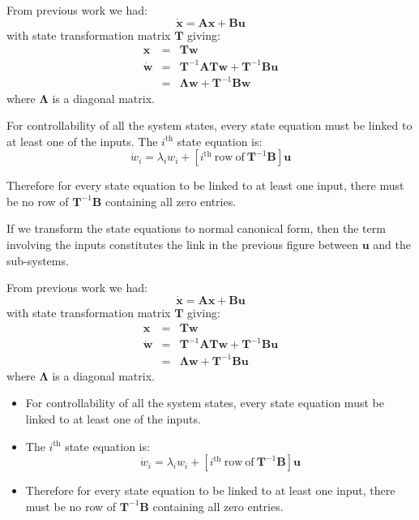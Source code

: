 From previous work we had:
\[
\dot{\mathbf{x}} = \mathbf{Ax} + \mathbf{Bu}
\]
with state transformation matrix $\mathbf{T}$ giving:
\begin{eqnarray*}
	\mathbf{x} & = & \mathbf{Tw} \\
	\dot{\mathbf{w}}& = &\mathbf{T}^{-1}\mathbf{ATw}+\mathbf{T}^{-1}\mathbf{Bu} \\
	& = & \mathbf{\Lambda w} + \mathbf{T}^{-1}\mathbf{Bw}
\end{eqnarray*}
where $\mathbf{\Lambda}$ is a diagonal matrix.
 
For controllability of all the system states, every state equation must be linked to at least one of the inputs. The $i^\mathrm{th}$ state equation is:
\[
\dot{w}_i = \lambda_iw_i + \left[i^{\mathrm{th}}\mathrm{\ row\ of\ }\mathbf{T}^{-1}\mathbf{B}\right]\mathbf{u}
\]
 
Therefore for every state equation to be linked to at least one input, there must be no row of $\mathbf{T}^{-1}\mathbf{B}$  containing all zero entries.
\ifslidesonly
\begin{slide}
   If we transform the state equations to normal canonical form, then the term involving the inputs constitutes the link in the previous figure between $\mathbf{u}$ and the sub-systems.

From previous work we had:
\[
\dot{\mathbf{x}} = \mathbf{Ax} + \mathbf{Bu}
\]
with state transformation matrix $\mathbf{T}$ giving:
\begin{eqnarray*}
	\mathbf{x} & = & \mathbf{Tw} \\
	\dot{\mathbf{w}}& = &\mathbf{T}^{-1}\mathbf{ATw}+\mathbf{T}^{-1}\mathbf{Bu} \\
	& = & \mathbf{\Lambda w} + \mathbf{T}^{-1}\mathbf{Bu}
\end{eqnarray*}
where $\mathbf{\Lambda}$ is a diagonal matrix.
\end{slide}

\begin{slide}
\begin{itemize}
	\item For controllability of all the system states, every state equation must be linked to at least one of the inputs.
	\item  The $i^\mathrm{th}$ state equation is:
	\[
	\dot{w}_i = \lambda_iw_i + \left[i^{\mathrm{th}}\mathrm{\ row\ of\ }\mathbf{T}^{-1}\mathbf{B}\right]\mathbf{u}
	\]
	\item Therefore for every state equation to be linked to at least one input, there must be no row of $\mathbf{T}^{-1}\mathbf{B}$  containing all zero entries.
\end{itemize}

\end{slide}
\fi


